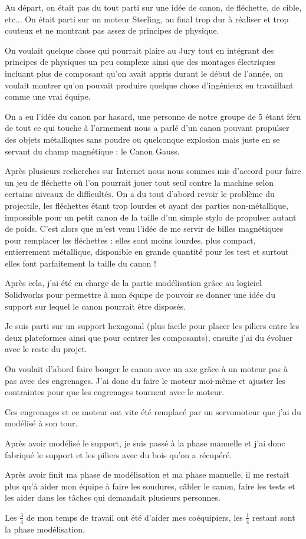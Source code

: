 Au départ, on était pas du tout parti sur une idée de canon, de fléchette, de cible, etc... On était parti sur un moteur Sterling, au final trop dur à réaliser et trop couteux et ne montrant pas assez de principes de physique.

On voulait quelque chose qui pourrait plaire au Jury tout en intégrant des principes de physiques un peu complexe ainsi que des montages électriques incluant plus de composant qu'on avait appris durant le début de l'année, on voulait montrer qu'on pouvait produire quelque chose d'ingénieux en travaillant comme une vrai équipe.

On a eu l'idée du canon par hasard, une personne de notre groupe de 5 étant féru de tout ce qui touche à l'armement nous a parlé d'un canon pouvant propulser des objets métalliques sans poudre ou quelconque explosion mais juste en se servant du champ magnétique : le Canon Gauss.

Après plusieurs recherches sur Internet nous nous sommes mis d'accord pour faire un jeu de fléchette où l'on pourrait jouer tout seul contre la machine selon certains niveaux de difficultés. On a du tout d'abord revoir le problème du projectile, les fléchettes étant trop lourdes et ayant des parties non-métallique, impossible pour un petit canon de la taille d'un simple stylo de propulser autant de poids. C'est alors que m'est venu l'idée de me servir de billes magnétiques pour remplacer les fléchettes : elles sont moins lourdes, plus compact, entierrement métallique, disponible en grande quantité pour les test et surtout elles font parfaitement la taille du canon !

Après cela, j'ai été en charge de la partie modélisation grâce au logiciel Solidworks pour permettre à mon équipe de pouvoir se donner une idée du support sur lequel  le canon pourrait être disposés. 

Je suis parti sur un support hexagonal (plus facile pour placer les piliers entre les deux plateformes ainsi que pour centrer les composants), ensuite j'ai du évoluer avec le reste du projet. 

On voulait d'abord faire bouger le canon avec un axe grâce à un moteur pas à pas avec des engrenages. J'ai donc du faire le moteur moi-même et ajuster les contraintes pour que les engrenages tournent avec le moteur.

Ces engrenages et ce moteur ont vite été remplacé par un servomoteur que j'ai du modélisé à son tour.

Après avoir modélisé le support, je suis passé à la phase manuelle et j'ai donc fabriqué le support et les piliers avec du bois qu'on a récupéré. 

Après avoir finit ma phase de modélisation et ma phase manuelle, il me restait plus qu'à aider mon équipe à faire les soudures, câbler le canon, faire les tests et les aider dans les tâches qui demandait plusieurs personnes.

Les $\frac{3}{4}$ de mon temps de travail ont été d'aider mes coéquipiers, les $\frac{1}{4}$ restant sont la phase modélisation.
